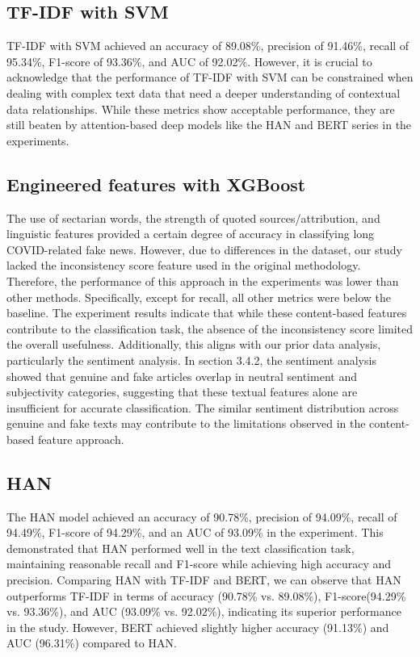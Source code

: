 \subsection{TF-IDF with SVM}
TF-IDF with SVM achieved an accuracy of 89.08\%, precision of 91.46\%, recall of 95.34\%, F1-score of 93.36\%, and AUC of 92.02\%. However, it is crucial to acknowledge that the performance of TF-IDF with SVM can be constrained when dealing with complex text data that need a deeper understanding of contextual data relationships. While these metrics show acceptable performance, they are still beaten by attention-based deep models like the HAN and BERT series in the experiments.

\subsection{Engineered features with XGBoost}
The use of sectarian words, the strength of quoted sources/attribution, and linguistic features provided a certain degree of accuracy in classifying long COVID-related fake news. However, due to differences in the dataset, our study lacked the inconsistency score feature used in the original methodology. Therefore, the performance of this approach in the experiments was lower than other methods. Specifically, except for recall, all other metrics were below the baseline. The experiment results indicate that while these content-based features contribute to the classification task, the absence of the inconsistency score limited the overall usefulness.
Additionally, this aligns with our prior data analysis, particularly the sentiment analysis. In section 3.4.2, the sentiment analysis showed that genuine and fake articles overlap in neutral sentiment and subjectivity categories, suggesting that these textual features alone are insufficient for accurate classification. The similar sentiment distribution across genuine and fake texts may contribute to the limitations observed in the content-based feature approach.

\subsection{HAN}
The HAN model achieved an accuracy of 90.78\%, precision of 94.09\%, recall of 94.49\%, F1-score of 94.29\%, and an AUC of 93.09\% in the experiment. This demonstrated that HAN performed well in the text classification task, maintaining reasonable recall and F1-score while achieving high accuracy and precision. Comparing HAN with TF-IDF and BERT, we can observe that HAN outperforms TF-IDF in terms of accuracy (90.78\% vs. 89.08\%), F1-score(94.29\% vs. 93.36\%), and AUC (93.09\% vs. 92.02\%), indicating its superior performance in the study. However, BERT achieved slightly higher accuracy (91.13\%) and AUC (96.31\%) compared to HAN.

